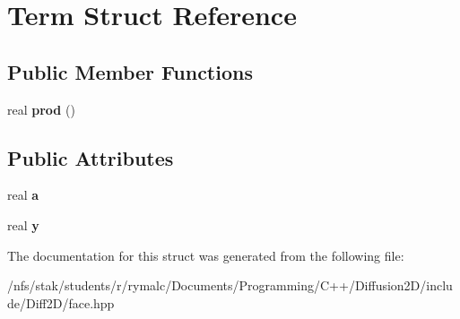 \hypertarget{structTerm}{\section{Term Struct Reference}
\label{structTerm}
}
\subsection*{Public Member Functions}
\begin{DoxyCompactItemize}
\item 
\hypertarget{structTerm_a90008c143070b0544ea0a5de0dd0d651}{real {\bfseries prod} ()}\label{structTerm_a90008c143070b0544ea0a5de0dd0d651}

\end{DoxyCompactItemize}
\subsection*{Public Attributes}
\begin{DoxyCompactItemize}
\item 
\hypertarget{structTerm_a5b8e26faad37a4317ce722efbb2fb345}{real {\bfseries a}}\label{structTerm_a5b8e26faad37a4317ce722efbb2fb345}

\item 
\hypertarget{structTerm_adc6281bf7884d8b213aa98a701b4e578}{real {\bfseries y}}\label{structTerm_adc6281bf7884d8b213aa98a701b4e578}

\end{DoxyCompactItemize}


The documentation for this struct was generated from the following file\+:\begin{DoxyCompactItemize}
\item 
/nfs/stak/students/r/rymalc/\+Documents/\+Programming/\+C++/\+Diffusion2\+D/include/\+Diff2\+D/face.\+hpp\end{DoxyCompactItemize}
